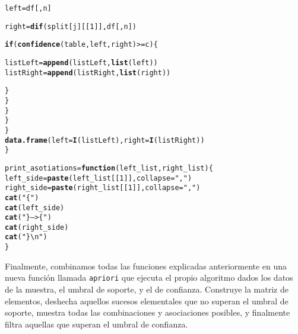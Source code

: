 \documentclass[12pt]{report}\usepackage[]{graphicx}\usepackage[dvipsnames]{xcolor}
\makeatletter
\newcommand{\hlnum}[1]{\textcolor[rgb]{0.686,0.059,0.569}{#1}}%
\newcommand{\hlstr}[1]{\textcolor[rgb]{0.192,0.494,0.8}{#1}}%
\newcommand{\hlopt}[1]{\textcolor[rgb]{0,0,0}{#1}}%
\newcommand{\hlstd}[1]{\textcolor[rgb]{0.345,0.345,0.345}{#1}}%
\newcommand{\hlkwa}[1]{\textcolor[rgb]{0.161,0.373,0.58}{\textbf{#1}}}%
\newcommand{\hlkwb}[1]{\textcolor[rgb]{0.69,0.353,0.396}{#1}}%
\newcommand{\hlkwc}[1]{\textcolor[rgb]{0.333,0.667,0.333}{#1}}%
\newcommand{\hlkwd}[1]{\textcolor[rgb]{0.737,0.353,0.396}{\textbf{#1}}}%
\newenvironment{kframe}{%
 \def\at@end@of@kframe{}%
 \ifinner\ifhmode%
  \def\at@end@of@kframe{\end{minipage}}%
  \begin{minipage}{\columnwidth}%
 \fi\fi%
 \def\FrameCommand##1{\hskip\@totalleftmargin \hskip-\fboxsep
 \colorbox{shadecolor}{##1}\hskip-\fboxsep
     \hskip-\linewidth \hskip-\@totalleftmargin \hskip\columnwidth}%
 \MakeFramed {\advance\hsize-\width
   \@totalleftmargin\z@ \linewidth\hsize
   \@setminipage}}%
 {\par\unskip\endMakeFramed%
 \at@end@of@kframe}
\newenvironment{knitrout}{}{} %
\makeatother
\begin{document}
\begin{knitrout}
\begin{kframe}
\begin{alltt}
                                        \hlstd{left} \hlkwb{=} \hlstd{df[,n]}

                                        \hlstd{right} \hlkwb{=} \hlkwd{dif}\hlstd{(split[j][[}\hlnum{1}\hlstd{]], df[,n])}

                                        \hlkwa{if} \hlstd{(}\hlkwd{confidence}\hlstd{(table, left, right)} \hlopt{>=} \hlstd{c) \{}

                                                \hlstd{listLeft} \hlkwb{=} \hlkwd{append}\hlstd{(listLeft ,} \hlkwd{list}\hlstd{(left))}
                                                \hlstd{listRight} \hlkwb{=} \hlkwd{append}\hlstd{(listRight ,} \hlkwd{list}\hlstd{(right))}

                                        \hlstd{\}}
                                \hlstd{\}}
                        \hlstd{\}}
                \hlstd{\}}
        \hlstd{\}}
        \hlkwd{data.frame}\hlstd{(}\hlkwc{left} \hlstd{=} \hlkwd{I}\hlstd{(listLeft),} \hlkwc{right} \hlstd{=} \hlkwd{I}\hlstd{(listRight))}
\hlstd{\}}
\end{alltt}
\end{kframe}
\end{knitrout}
			
\begin{knitrout}
\color{fgcolor}\begin{kframe}
\begin{alltt}
\hlstd{print_asotiations} \hlkwb{=} \hlkwa{function}\hlstd{(}\hlkwc{left_list}\hlstd{,} \hlkwc{right_list}\hlstd{)\{}
        \hlstd{left_side} \hlkwb{=} \hlkwd{paste}\hlstd{(left_list[[}\hlnum{1}\hlstd{]],} \hlkwc{collapse} \hlstd{=} \hlstr{","}\hlstd{)}
        \hlstd{right_side} \hlkwb{=} \hlkwd{paste}\hlstd{(right_list[[}\hlnum{1}\hlstd{]],} \hlkwc{collapse} \hlstd{=} \hlstr{","}\hlstd{)}
        \hlkwd{cat}\hlstd{(}\hlstr{"\{"}\hlstd{)}
        \hlkwd{cat}\hlstd{(left_side)}
        \hlkwd{cat}\hlstd{(}\hlstr{"\} --> \{"}\hlstd{)}
        \hlkwd{cat}\hlstd{(right_side)}
        \hlkwd{cat}\hlstd{(}\hlstr{"\}\textbackslash{}n"}\hlstd{)}
\hlstd{\}}
\end{alltt}
\end{kframe}
\end{knitrout}
			
			Finalmente, combinamos todas las funciones explicadas anteriormente en una nueva función llamada \texttt{apriori} que ejecuta el propio algoritmo dados los datos de la muestra, el umbral de soporte, y el de confianza. Construye la matriz de elementos, deshecha aquellos sucesos elementales que no superan el umbral de soporte, muestra todas las combinaciones y asociaciones posibles, y finalmente filtra aquellas que superan el umbral de confianza. 
			
\end{document}
